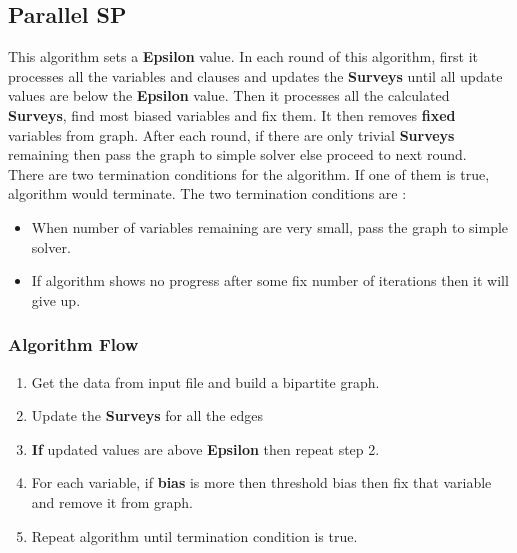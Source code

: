 \documentclass{article}
\begin{document}
\subsection{Parallel SP} 

This algorithm sets a \textbf{Epsilon} value. In each round of this algorithm, first it processes all the variables and clauses and updates the \textbf{Surveys} until all update values are below the \textbf{Epsilon} value. Then it processes all the calculated \textbf{Surveys}, find most biased variables and fix them. It then removes \textbf{fixed} variables from graph. After each round, if there are only trivial \textbf{Surveys} remaining then pass the graph to simple solver else proceed to next round. \\

There are two termination conditions for the algorithm. If one of them is true, algorithm would terminate. The two termination conditions are :
\begin{itemize}
\item When number of variables remaining are very small, pass the graph to simple solver.
\item If algorithm shows no progress after some fix number of iterations then it will give up.\\
\end{itemize}


\subsubsection{Algorithm Flow}

\begin{enumerate}
\item Get the data from input file and build a bipartite graph.
\item Update the \textbf{Surveys} for all the edges
\item \textbf{If} updated values are above \textbf{Epsilon} then repeat step 2.
\item For each variable, if \textbf{bias} is more then threshold bias then fix that variable and remove it from graph.
\item Repeat algorithm until termination condition is true. 
\end{enumerate}

\end{document}
